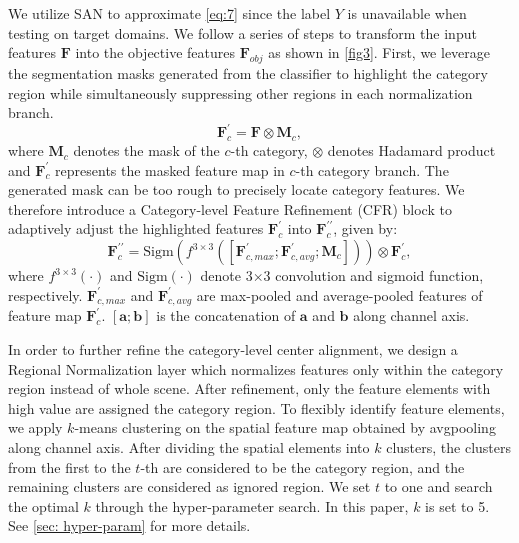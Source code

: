 \documentclass[10pt,twocolumn,letterpaper]{article}
\begin{document}
We utilize SAN to approximate \cref{eq:7} since the label $Y$ is unavailable when testing on target domains. We follow a series of steps to transform the input features $\mathbf{F}$ into the objective features $\mathbf{F}_{obj}$ as shown in \cref{fig3}. First, we leverage the segmentation masks generated from the classifier to highlight the category region while simultaneously suppressing other regions in each normalization branch. 
\vspace{-0.8mm}
\begin{equation}
\mathbf{F}_{c}^{\prime}=\mathbf{F}\otimes\mathbf{M}_{c},
\end{equation}
where $\mathbf{M}_{c}$ denotes the mask of the $c$-th category, $\otimes$ denotes Hadamard product and $\mathbf{F}_{c}^{\prime}$ represents the masked feature map in $c$-th category branch. The generated mask can be too rough to precisely locate category features. We therefore introduce a Category-level Feature Refinement (CFR) block to adaptively adjust the highlighted features $\mathbf{F}_{c}^{\prime}$ into $\mathbf{F}_{c}^{\prime\prime}$, given by:
\begin{equation}
\mathbf{F}_{c}^{\prime\prime}=\mathrm{Sigm}(f^{3\times3}([\mathbf{F}_{c,max}^{\prime};\mathbf{F}_{c,avg}^{\prime};\mathbf{M}_{c}]))\otimes\mathbf{F}_{c}^{\prime},
\end{equation}
where $f^{3\times3}(\cdot)$ and $\mathrm{Sigm}(\cdot)$ denote $3$$\times$$3$ convolution and sigmoid function, respectively. $\mathbf{F}_{c,max}^{\prime}$  and $\mathbf{F}_{c,avg}^{\prime}$ are max-pooled and average-pooled features of feature map $\mathbf{F}_{c}^{\prime}$. $[\mathbf{a};\mathbf{b}]$ is the concatenation of $\mathbf{a}$ and $\mathbf{b}$ along channel axis.

In order to further refine the category-level center alignment, we design a Regional Normalization layer which normalizes features only within the category region instead of whole scene. After refinement, only the feature elements with high value are assigned the category region. To flexibly identify feature elements, we apply $k$-means clustering on the spatial feature map obtained by avgpooling along channel axis. After dividing the spatial elements into $k$ clusters, the clusters from the first to the $t$-th are considered to be the category region, and the remaining clusters are considered as ignored region. We set $t$ to one and search the optimal $k$ through the hyper-parameter search. In this paper, $k$ is set to 5. See \cref{sec: hyper-param} for more details.
\end{document}
